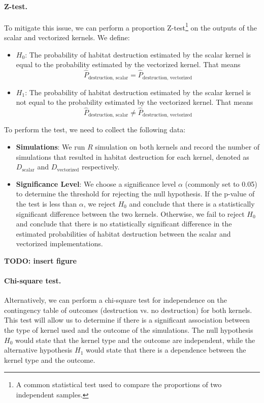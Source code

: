 \paragraph{Z-test.}
To mitigate this issue, we can perform a proportion Z-test\footnote{A common statistical test used to compare the proportions of two independent samples.} on the outputs of the scalar and vectorized kernels. We define:
\begin{itemize}
    \item $H_0$: The probability of habitat destruction estimated by the scalar kernel is equal to the probability estimated by the vectorized kernel. That means 
    \[
    \hat{P}_{\text{destruction, scalar}} = \hat{P}_{\text{destruction, vectorized}}
    \]
    \item $H_1$: The probability of habitat destruction estimated by the scalar kernel is not equal to the probability estimated by the vectorized kernel. That means 
    \[
    \hat{P}_{\text{destruction, scalar}} \neq \hat{P}_{\text{destruction, vectorized}}
    \]
\end{itemize}

\noindent
To perform the test, we need to collect the following data:
\begin{itemize}
    \item \textbf{Simulations}: We run $R$ simulation on both kernels and record the number of simulations that resulted in habitat destruction for each kernel, denoted as $D_{\text{scalar}}$ and $D_{\text{vectorized}}$ respectively.
    \item \textbf{Significance Level}: We choose a significance level $\alpha$ (commonly set to 0.05) to determine the threshold for rejecting the null hypothesis. If the p-value of the test is less than $\alpha$, we reject $H_0$ and conclude that there is a statistically significant difference between the two kernels. Otherwise, we fail to reject $H_0$ and conclude that there is no statistically significant difference in the estimated probabilities of habitat destruction between the scalar and vectorized implementations.
\end{itemize}

\textbf{TODO: insert figure}

\paragraph{Chi-square test.}
Alternatively, we can perform a chi-square test for independence on the contingency table of outcomes (destruction vs. no destruction) for both kernels. This test will allow us to determine if there is a significant association between the type of kernel used and the outcome of the simulations. The null hypothesis $H_0$ would state that the kernel type and the outcome are independent, while the alternative hypothesis $H_1$ would state that there is a dependence between the kernel type and the outcome.

